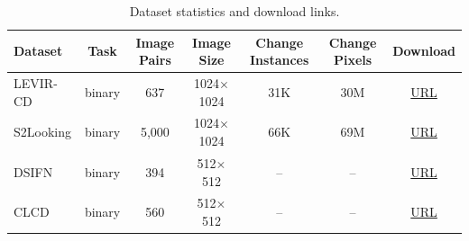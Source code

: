 \begin{table}[t]
  \centering
  \caption{Dataset statistics and download links.}
  \label{tab:datasets}
  \setlength{\tabcolsep}{7pt}
  \renewcommand{\arraystretch}{1.08}
  \small
  \begin{tabular}{l c c c c c c}
    \toprule
    Dataset & Task & Image Pairs & Image Size & Change Instances & Change Pixels & Download \\
    \midrule
    LEVIR-CD & binary & 637 & 1024$\times$1024 & 31K & 30M & \href{https://github.com/justchenhao/LEVIR}{URL} \\
    S2Looking & binary & 5,000 & 1024$\times$1024 & 66K & 69M & \href{https://github.com/S2Looking/Dataset}{URL} \\
    DSIFN & binary & 394 & 512$\times$512 & -- & -- & \href{https://geozcx.github.io/A-deeply-supervised-image-fusion-network-for-change-detection-in-remote-sensing-images/}{URL} \\
    CLCD & binary & 560 & 512$\times$512 & -- & -- & \href{https://github.com/liumency/CropLand-CD}{URL} \\
    \bottomrule
  \end{tabular}
\end{table}
